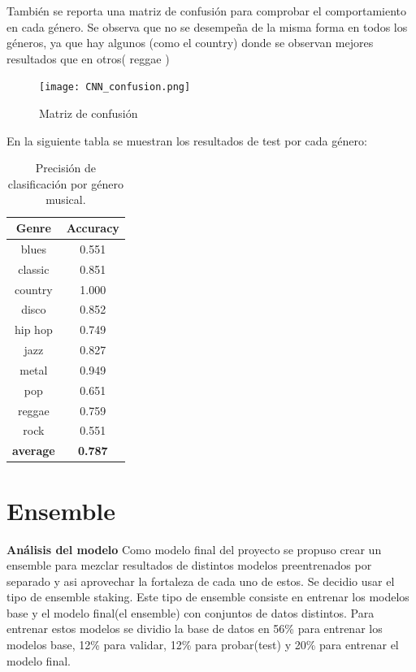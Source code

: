 \documentclass[colorinlistoftodos,twoside,twocolumn,10pt]{article} %
\begin{document}
También se reporta una matriz de confusión para comprobar
el comportamiento en cada género. Se observa que no
se desempeña de la misma forma en todos los géneros,
ya que hay algunos (como el country) donde se
observan mejores resultados que en otros( reggae )
\begin{figure}[h!] %
	\centering
	\texttt{[image: CNN\_confusion.png]}
	\caption{Matriz de confusión}
\end{figure}

En la siguiente tabla se muestran los resultados de test por cada g\'enero:
\begin{table}[h]
\centering
\begin{tabular}{|c|c|}
\hline
\textbf{Genre} & \textbf{Accuracy} \\ \hline
blues & 0.551 \\ \hline
classic & 0.851 \\ \hline
country & 1.000 \\ \hline
disco & 0.852 \\ \hline
hip hop & 0.749 \\ \hline
jazz & 0.827 \\ \hline
metal & 0.949 \\ \hline
pop & 0.651 \\ \hline
reggae & 0.759 \\ \hline
rock & 0.551 \\ \hline
\textbf{average} & \textbf{0.787} \\ \hline
\end{tabular}
\caption{Precisión de clasificación por género musical.}
\label{tabla:1}
\end{table}

\section{Ensemble}
\textbf{\large An\'alisis del modelo}
Como modelo final del proyecto se propuso crear un ensemble para mezclar resultados de distintos modelos preentrenados por separado y asi aprovechar la fortaleza de cada uno de estos. Se decidio usar el tipo de ensemble staking. Este tipo de ensemble consiste en entrenar los modelos base y el modelo final(el ensemble) con conjuntos de datos distintos. Para entrenar estos modelos se dividio la base de datos en 56\% para entrenar los modelos base, 12\% para validar, 12\% para probar(test) y 20\% para entrenar el modelo final.
\end{document}
